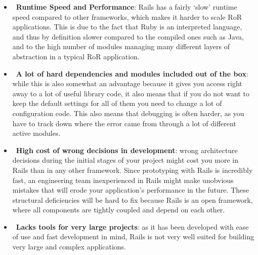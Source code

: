 \begin{itemize}
\item~\textbf{Runtime Speed and Performance}: Rails has a fairly ‘slow’ runtime speed compared to other frameworks, which makes it harder to scale RoR applications. This is due to the fact that Ruby is an interpreted language, and thus by definition slower compared to the compiled ones such as Java, and to the high number of modules managing many different layers of abstraction in a typical RoR application.

\item~\textbf{A lot of hard dependencies and modules included out of the box}: while this is also somewhat an advantage because it gives you access right away to a lot of useful library code, it also means that if you do not want to keep the default settings for all of them you need to change a lot of configuration code. This also means that debugging is often harder, as you have to track down where the error came from through a lot of different active modules.

\item~\textbf{High cost of wrong decisions in development}: wrong architecture decisions during the initial stages of your project might cost you more in Rails than in any other framework. Since prototyping with Rails is incredibly fast, an engineering team inexperienced in Rails might make unobvious mistakes that will erode your application’s performance in the future. These structural deficiencies will be hard to fix because Rails is an open framework, where all components are tightly coupled and depend on each other.

\item~\textbf{Lacks tools for very large projects}: as it has been developed with ease of use and fast development in mind, Rails is not very well suited for building very large and complex applications.
\end{itemize}